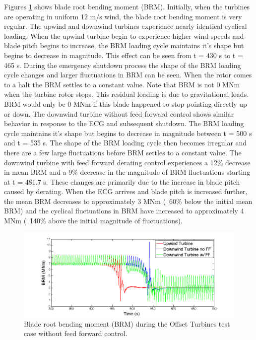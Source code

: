 Figures \ref{fig6-18} shows blade root bending moment (BRM). Initially, when the turbines are operating in uniform 12 m/s wind, the blade root bending moment is very regular. The upwind and downwind turbines experience nearly identical cyclical loading. When the upwind turbine begin to experience higher wind speeds and blade pitch begins to increase, the BRM loading cycle maintains it's shape but begins to decrease in magnitude. This effect can be seen from t = 430 s to t = 465 s. During the emergency shutdown process the shape of the BRM loading cycle changes and larger fluctuations in BRM can be seen. When the rotor comes to a halt the BRM settles to a constant value. Note that BRM is not 0 MNm when the turbine rotor stops. This residual loading is due to gravitational loads. BRM would only be 0 MNm if this blade happened to stop pointing directly up or down. The downwind turbine without feed forward control shows similar behavior in response to the ECG and subsequent shutdown. The BRM loading cycle maintains it's shape but begins to decrease in magnitude between t = 500 s and t = 535 s. The shape of the BRM loading cycle then becomes irregular and there are a few large fluctuations before BRM settles to a constant value. The downwind turbine with feed forward derating control experiences a 12\% decrease in mean BRM and a 9\% decrease in the magnitude of BRM fluctuations starting at t = 481.7 s. These changes are primarily due to the increase in blade pitch caused by derating. When the ECG arrives and blade pitch is increased further, the mean BRM decreases to approximately 3 MNm (~60\% below the initial mean BRM) and the cyclical fluctuations in BRM have increased to approximately 4 MNm (~140\% above the initial magnitude of fluctuations).


\begin{figure}[ht] 
	\centering
		\includegraphics[width = \linewidth]{Figures/ch6Figures/fig6-18.png}

	\caption{Blade root bending moment (BRM) during the Offset Turbines test case without feed forward control.}
	\label{fig6-18}
\end{figure}


